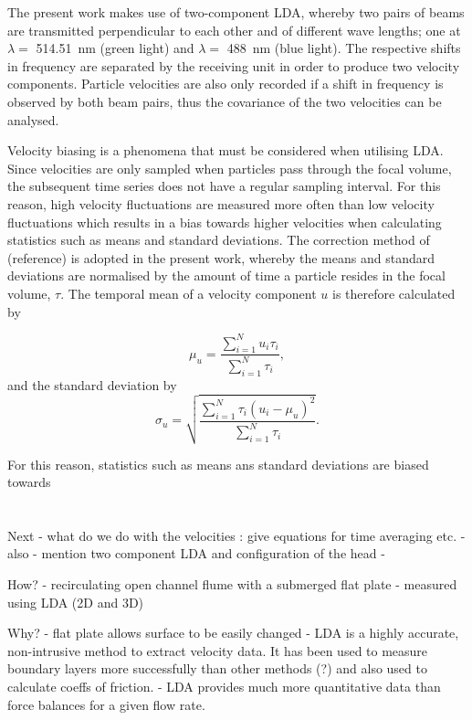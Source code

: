 \documentclass[12pt,oneside,a4paper]{article}
\begin{document}
The present work makes use of two-component LDA, whereby two pairs of beams are transmitted perpendicular to each other and of different wave lengths; one at $\lambda = $ \SI{514.51}{nm} (green light) and $\lambda = $ \SI{488}{nm} (blue light). The respective shifts in frequency are separated by the receiving unit in order to produce two velocity components. Particle velocities are also only recorded if a shift in frequency is observed by both beam pairs, thus the covariance of the two velocities can be analysed. 

Velocity biasing is a phenomena that must be considered when utilising LDA. Since velocities are only sampled when particles pass through the focal volume, the subsequent time series does not have a regular sampling interval. For this reason, high velocity fluctuations are measured more often than low velocity fluctuations which results in a bias towards higher velocities when calculating statistics such as means and standard deviations. The correction method of (reference) is adopted in the present work, whereby the means and standard deviations are normalised by the amount of time a particle resides in the focal volume, $\tau$. The temporal mean of a velocity component $u$ is therefore calculated by

\begin{equation}
\mu_u = \frac{\sum^N_{i=1} u_i \tau_i}{\sum^N_{i=1} \tau_i}, 
\end{equation}
and the standard deviation by
\begin{equation}
\sigma_u = \sqrt{\frac{\sum^N_{i=1} \tau_i (u_i - \mu_u)^2}{\sum^N_{i=1} \tau_i}}.
\end{equation}


 For this reason, statistics such as means ans standard deviations are biased towards  
\\\\\\
 
Next - what do we do with the velocities : give equations for time averaging etc.
	-	also - mention two component LDA and configuration of the head
	-	




\vspace{2cm}

How?
	-	recirculating open channel flume with a submerged flat plate
	-	measured using LDA (2D and 3D)

Why?
	-	flat plate allows surface to be easily changed
	-	LDA is a highly accurate, non-intrusive method to extract 
		velocity data. It has been used to measure boundary layers 
		more successfully than other methods (?) and also used to 
		calculate coeffs of friction.
	-	LDA provides much more quantitative data than force balances
		for a given flow rate.
\end{document}
